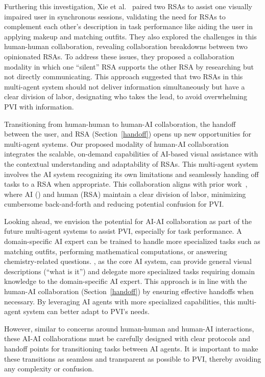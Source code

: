 Furthering this investigation, Xie et al.~\cite{xie2023two} paired two RSAs to assist one visually impaired user in synchronous sessions, validating the need for RSAs to complement each other's description in task performance like aiding the user in applying makeup and matching outfits. They also explored the challenges in this human-human collaboration, revealing collaboration breakdowns between two opinionated RSAs. 
% 
To address these issues, they proposed a collaboration modality in which one ``silent'' RSA supports the other RSA by researching but not directly communicating. This approach suggested that two RSAs in this multi-agent system should not deliver information simultaneously but have a clear division of labor, designating who takes the lead, to avoid overwhelming PVI with information. 


Transitioning from human-human to human-AI collaboration, the handoff between the user, \bma{} and RSA (Section~\ref{handoff}) opens up new opportunities for multi-agent systems. 
% 
Our proposed modality of human-AI collaboration integrates the scalable, on-demand capabilities of AI-based visual assistance with the contextual understanding and adaptability of RSAs. 
This multi-agent system involves the AI system recognizing its own limitations and seamlessly handing off tasks to a RSA when appropriate. This collaboration aligns with prior work~\cite{xie2023two}, where AI (\bma) and human (RSA) maintain a clear division of labor, minimizing cumbersome back-and-forth and reducing potential confusion for PVI. 



Looking ahead, we envision the potential for AI-AI collaboration as part of the future multi-agent systems to assist PVI, especially for task performance. 
A domain-specific AI expert can be trained to handle more specialized tasks such as matching outfits, performing mathematical computations, or answering chemistry-related questions. \bma, as the core AI system, can provide general visual descriptions (``what is it'') and delegate more specialized tasks requiring domain knowledge to the domain-specific AI expert. 
% 
This approach is in line with the human-AI collaboration (Section~\ref{handoff}) by ensuring effective handoffs when necessary. By leveraging AI agents with more specialized capabilities, this multi-agent system can better adapt to PVI's needs. 



However, similar to concerns around human-human and human-AI interactions, these AI-AI collaborations must be carefully designed with clear protocols and handoff points for transitioning tasks between AI agents. It is important to make these transitions as seamless and transparent as possible to PVI, thereby avoiding any complexity or confusion. 




